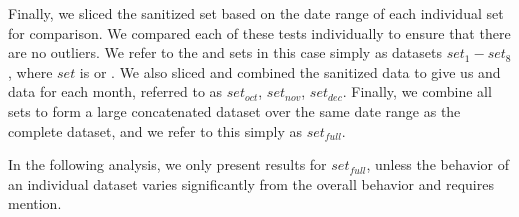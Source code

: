 

Finally, we sliced the sanitized \test set based on the date range of each individual \control set for comparison. We compared each of these tests individually to ensure that there are no outliers. We refer to the \test and \control sets in this case simply as datasets $set_1 - set_8$, where $set$ is \test or \control. We also sliced and combined the sanitized data to give us \control and \test data for each month, referred to as $set_{oct}$, $set_{nov}$, $set_{dec}$. Finally, we combine all \control sets to form a large concatenated dataset over the same date range as the complete \test dataset, and we refer to this simply as $set_{full}$. 

In the following analysis, we only present results for $set_{full}$, unless the behavior of an individual dataset varies significantly from the overall behavior and requires mention.



